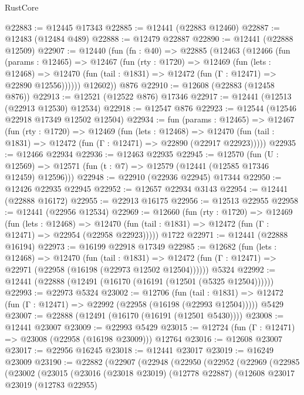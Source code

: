 \begin{lexlean}{RustCore}
\begin{coremodule}
@22883 := @12445 @17343
@22885 := @12441 (@22883 @12460)
@22887 := @12483 (@12484 @489)
@22888 := @12479 @22887
@22890 := @12441 (@22888 @12509)
@22907 := @12440
    (fun (fn : @40) =>
    @22885
      (@12463
        (@12466
          (fun (params : @12465) =>
          @12467
            (fun (rty : @1720) =>
            @12469
              (fun (lets : @12468) =>
              @12470 (fun (tail : @1831) => @12472 (fun (Γ : @12471) => @22890 @12556))))))
        @12602))
    @876
@22910 := @12608 (@22883 (@12458 @876))
@22913 := @12521 (@12522 @876) @17346
@22917 := @12441 (@12513 (@22913 @12530) @12534)
@22918 := @12547 @876
@22923 := @12544 (@12546 @22918 @17349 @12502 @12504)
@22934 := fun (params : @12465) =>
  @12467
    (fun (rty : @1720) =>
    @12469
      (fun (lets : @12468) =>
      @12470 (fun (tail : @1831) => @12472 (fun (Γ : @12471) => @22890 (@22917 @22923)))))
@22935 := @12466 @22934
@22936 := @12463 @22935
@22945 := @12570
    (fun (U : @12569) => @12571 (fun (t : @7) => @12579 (@12441 (@12585 @17346 @12459) @12596)))
@22948 := @22910 (@22936 @22945) @17344
@22950 := @12426 @22935 @22945
@22952 := @12657 @22934 @3143
@22954 := @12441 (@22888 @16172)
@22955 := @22913 @16175
@22956 := @12513 @22955
@22958 := @12441 (@22956 @12534)
@22969 := @12660
    (fun (rty : @1720) =>
    @12469
      (fun (lets : @12468) =>
      @12470 (fun (tail : @1831) => @12472 (fun (Γ : @12471) => @22954 (@22958 @22923)))))
    @1722
@22971 := @12441 (@22888 @16194)
@22973 := @16199 @22918 @17349
@22985 := @12682
    (fun (lets : @12468) =>
    @12470
      (fun (tail : @1831) =>
      @12472 (fun (Γ : @12471) => @22971 (@22958 (@16198 (@22973 @12502 @12504))))))
    @5324
@22992 := @12441 (@22888 (@12491 (@16170 (@16191 (@12501 (@5325 @12504))))))
@22993 := @22973 @5324
@23002 := @12706
    (fun (tail : @1831) => @12472 (fun (Γ : @12471) => @22992 (@22958 (@16198 (@22993 @12504)))))
    @5429
@23007 := @22888 (@12491 (@16170 (@16191 (@12501 @5430))))
@23008 := @12441 @23007
@23009 := @22993 @5429
@23015 := @12724 (fun (Γ : @12471) => @23008 (@22958 (@16198 @23009))) @12764
@23016 := @12608 @23007
@23017 := @22956 @16245
@23018 := @12441 @23017
@23019 := @16249 @23009
@23190 := @22882
    (@22907
      (@22948
        (@22950
          (@22952
            (@22969
              (@22985
                (@23002
                  (@23015
                    (@23016
                      (@23018 @23019)
                      (@12778 @22887)
                      (@12608
                        @23017
                        @23019
                        (@12783 @22955)

\end{coremodule}
\end{lexlean}
